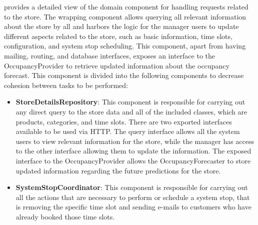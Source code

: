  provides a detailed view of the domain component for handling requests related to the store.
The wrapping component allows querying all relevant information about the store by all and harbors the logic for the manager users to update different aspects related to the store, such as basic information, time slots, configuration, and system stop scheduling.
This component, apart from having mailing, routing, and database interfaces, exposes an interface to the OccupancyProvider to retrieve updated information about the occupancy forecast. %
This component is divided into the following components to decrease cohesion between tasks to be performed:
\begin{itemize}
    \item \textbf{StoreDetailsRepository}: This component is responsible for carrying out any direct query to the store data and all of the included classes, which are products, categories, and time slots.
    There are two exported interfaces available to be used via HTTP.
    The query interface allows all the system users to view relevant information for the store, while the manager has access to the other interface allowing them to update the information.
    The exposed interface to the OccupancyProvider allows the OccupancyForecaster to store updated information regarding the future predictions for the store.
    \item \textbf{SystemStopCoordinator}: This component is responsible for carrying out all the actions that are necessary to perform or schedule a system stop, that is removing the specific time slot and sending e-mails to customers who have already booked those time slots.\end{itemize}

